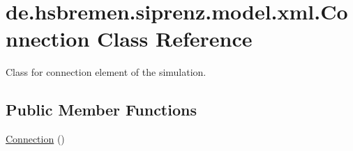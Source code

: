 \hypertarget{classde_1_1hsbremen_1_1siprenz_1_1model_1_1xml_1_1Connection}{}\section{de.\+hsbremen.\+siprenz.\+model.\+xml.\+Connection Class Reference}
\label{classde_1_1hsbremen_1_1siprenz_1_1model_1_1xml_1_1Connection}


Class for connection element of the simulation.  


\subsection*{Public Member Functions}
\begin{DoxyCompactItemize}
\item 
\hyperlink{classde_1_1hsbremen_1_1siprenz_1_1model_1_1xml_1_1Connection_a2ba40a1c400262437eb0246ae869e9f8}{Connection} ()\hypertarget{classde_1_1hsbremen_1_1siprenz_1_1model_1_1xml_1_1Connection_a2ba40a1c400262437eb0246ae869e9f8}{}\label{classde_1_1hsbremen_1_1siprenz_1_1model_1_1xml_1_1Connection_a2ba40a1c400262437eb0246ae869e9f8}


\end{DoxyCompactItemize}
